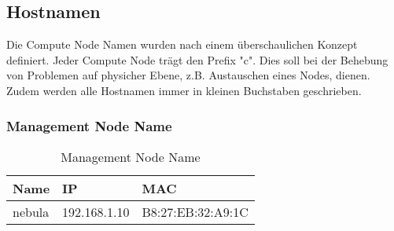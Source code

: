 \subsection{Hostnamen}
Die Compute Node Namen wurden nach einem überschaulichen Konzept definiert. Jeder Compute Node trägt den Prefix "c". Dies soll bei der Behebung von Problemen auf physicher Ebene, z.B. Austauschen eines Nodes, dienen. Zudem werden alle Hostnamen immer in kleinen Buchstaben geschrieben. 

\subsubsection{Management Node Name}
\begin{table}[H]
\centering
\begin{tabular}{p{5cm}p{5.5cm}p{5.5cm}}
\hline
\rowcolor{heading} \textbf{Name} & \textbf{IP} & \textbf{MAC} \\\hline
nebula & 192.168.1.10 & B8:27:EB:32:A9:1C \\\hline
\end{tabular}
\caption{Management Node Name}
\end{table}

